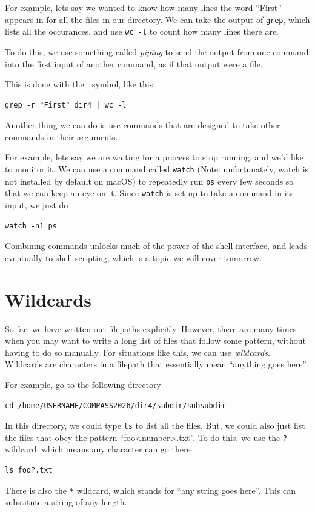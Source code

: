 \documentclass[aps,showpacs,prd,notitlepage,preprintnumbers,amsmath,amssymb,letterpaper]{revtex4}
\begin{document}
For example, lets say we wanted to know how many lines the word ``First'' appears in for all the files in our directory.
We can take the output of \verb|grep|, which lists all the occurances, and use \verb|wc -l| to count how many lines there are.

To do this, we use something called \textit{piping} to send the output from one command into the first input of another command, as if that output were a file.

This is done with the $|$ symbol, like this
\begin{verbatim}
grep -r "First" dir4 | wc -l
\end{verbatim}

Another thing we can do is use commands that are designed to take other commands in their arguments.

For example, lets say we are waiting for a process to stop running, and we'd like to monitor it.
We can use a command called \verb|watch| (Note: unfortunately, watch is not installed by default on macOS) to repeatedly run \verb|ps| every few seconds so that we can keep an eye on it.
Since \verb|watch| is set up to take a command in its input, we just do
\begin{verbatim}
watch -n1 ps
\end{verbatim}

Combining commands unlocks much of the power of the shell interface, and leads eventually to shell scripting, which is a topic we will cover tomorrow.

\section{Wildcards}
So far, we have written out filepaths explicitly. However, there are many times when you may want to write a long list of files that follow some pattern, without having to do so manually.
For situations like this, we can use \textit{wildcards}. Wildcards are characters in a filepath that essentially mean ``anything goes here''

For example, go to the following directory
\begin{verbatim}
cd /home/USERNAME/COMPASS2026/dir4/subdir/subsubdir
\end{verbatim}
In this directory, we could type \verb|ls| to list all the files.
But, we could also just list the files that obey the pattern ``foo<number>.txt''.
To do this, we use the \verb|?| wildcard, which means any character can go there

\begin{verbatim}
ls foo?.txt
\end{verbatim}
There is also the \verb|*| wildcard, which stands for ``any string goes here''.
This can substitute a string of any length.
\end{document}
